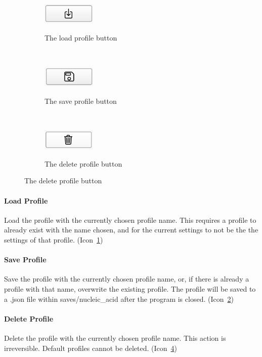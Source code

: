 \documentclass[
titlepage,
fontsize=12pt
]{article}
\begin{document}
	\begin{figure}
		\caption{Various Profile Actions}
		
		\centering
		\begin{subfigure}{.3\textwidth}
			\centering
			\caption{The load profile button}
			\includegraphics[width=1in]{load-profile-button.png}
			\label{fig:load-profile-button}
		\end{subfigure}%
		~
		\begin{subfigure}{.3\textwidth}
			\centering
			\caption{The save profile button}
			\includegraphics[width=1in]{save-profile-button.png}
			\label{fig:save-profile-button}
		\end{subfigure}%
		~
		\begin{subfigure}{.3\textwidth}
			\centering
			\caption{The delete profile button}
			\includegraphics[width=1in]{delete-profile-button.png}
			\label{fig:delete-profile-button}
		\end{subfigure}
	\end{figure}
	
	\paragraph{Load Profile}
	Load the profile with the currently chosen profile name. This requires a profile to already exist with the name chosen, and for the current settings to not be the  the settings of that profile. (Icon~\ref{fig:load-profile-button})
	
	\paragraph{Save Profile}
	Save the profile with the currently chosen profile name, or, if there is already a profile with that name, overwrite the existing profile. The profile will be saved to a .json file within saves/nucleic\_acid after the program is closed. (Icon~\ref{fig:save-profile-button})
	
	\paragraph{Delete Profile}
	Delete the profile with the currently chosen profile name. This action is irreversible. Default profiles cannot be deleted. (Icon~\ref{fig:delete-profile-button})
\end{document}
